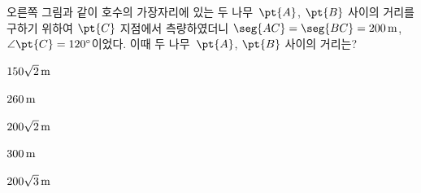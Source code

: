 \noindent\begin{minipage}[t]{0.58\linewidth}\vspace{0pt}\raggedright 오른쪽 그림과 같이 호수의 가장자리에 있는 두 나무~$\pt{A}$, $\pt{B}$ 사이의 거리를 구하기 위하여 $\pt{C}$ 지점에서 측량하였더니 $\seg{AC}=\seg{BC}=200\mkern3mu \mathrm{m}$, $\angle\pt{C}=120^\circ$이었다. 이때 두 나무~$\pt{A}$, $\pt{B}$ 사이의 거리는?\end{minipage}\hfill\begin{minipage}[t]{0.4\linewidth}\vspace{0pt}\centering \resizebox{\ifdim\width>\linewidth\linewidth\else\width\fi}{!}{}\end{minipage}\par
\begin{choices32}{\rule[-3ex]{0pt}{8ex}$150\sqrt{2}\mkern3mu \mathrm{m}$}{\rule[-3ex]{0pt}{8ex}$260\mkern3mu \mathrm{m}$}{\rule[-3ex]{0pt}{8ex}$200\sqrt{2}\mkern3mu \mathrm{m}$}{\rule[-3ex]{0pt}{8ex}$300\mkern3mu \mathrm{m}$}{\rule[-3ex]{0pt}{8ex}$200\sqrt{3}\mkern3mu \mathrm{m}$}\end{choices32}
